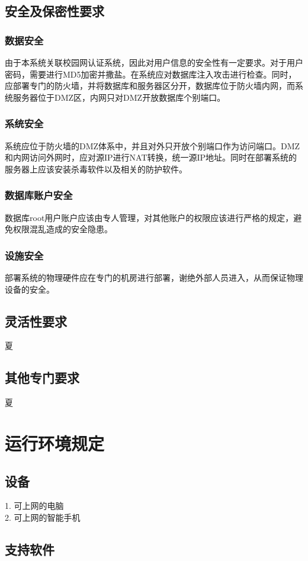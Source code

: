 \documentclass[UTF8]{ctexart}
\begin{document}
\subsection{安全及保密性要求}
\subsubsection*{数据安全}
由于本系统关联校园网认证系统，因此对用户信息的安全性有一定要求。对于用户密码，需要进行MD5加密并撒盐。在系统应对数据库注入攻击进行检查。同时，应部署专门的防火墙，并将数据库和服务器区分开，数据库位于防火墙内网，而系统服务器位于DMZ区，内网只对DMZ开放数据库个别端口。

\subsubsection*{系统安全}
系统应位于防火墙的DMZ体系中，并且对外只开放个别端口作为访问端口。DMZ和内网访问外网时，应对源IP进行NAT转换，统一源IP地址。同时在部署系统的服务器上应该安装杀毒软件以及相关的防护软件。

\subsubsection*{数据库账户安全}
数据库root用户账户应该由专人管理，对其他账户的权限应该进行严格的规定，避免权限混乱造成的安全隐患。

\subsubsection*{设施安全}
部署系统的物理硬件应在专门的机房进行部署，谢绝外部人员进入，从而保证物理设备的安全。

\subsection{灵活性要求}
夏
\subsection{其他专门要求}
夏

\section{运行环境规定}
\subsection{设备}
1. 可上网的电脑\\
2. 可上网的智能手机
\subsection{支持软件}
\end{document}
